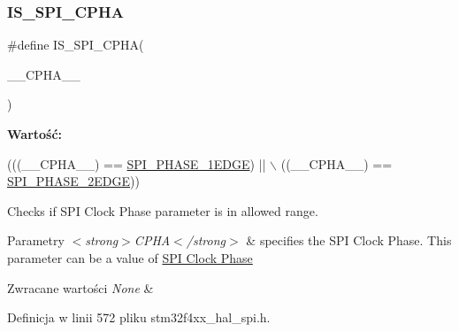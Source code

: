 \mbox{\label{group___s_p_i___private___macros_gaf5ed92fbe83dada8ebcce64c04ef0f72}} 
\subsubsection{\texorpdfstring{I\+S\+\_\+\+S\+P\+I\+\_\+\+C\+P\+HA}{IS\_SPI\_CPHA}}
{\footnotesize\ttfamily \#define I\+S\+\_\+\+S\+P\+I\+\_\+\+C\+P\+HA(\begin{DoxyParamCaption}\item[{}]{\+\_\+\+\_\+\+C\+P\+H\+A\+\_\+\+\_\+ }\end{DoxyParamCaption})}

{\bfseries Wartość\+:}
\begin{DoxyCode}
(((\_\_CPHA\_\_) == \hyperlink{group___s_p_i___clock___phase_ga208be78b79c51df200a495c4d2110b57}{SPI\_PHASE\_1EDGE}) || \(\backslash\)
                               ((\_\_CPHA\_\_) == \hyperlink{group___s_p_i___clock___phase_ga960275ac1d01d302c48e713399990c36}{SPI\_PHASE\_2EDGE}))
\end{DoxyCode}


Checks if S\+PI Clock Phase parameter is in allowed range. 


\begin{DoxyParams}{Parametry}
{\em $<$strong$>$\+C\+P\+H\+A$<$/strong$>$} & specifies the S\+PI Clock Phase. This parameter can be a value of \hyperlink{group___s_p_i___clock___phase}{S\+PI Clock Phase} \\
\hline
\end{DoxyParams}

\begin{DoxyRetVals}{Zwracane wartości}
{\em None} & \\
\hline
\end{DoxyRetVals}


Definicja w linii 572 pliku stm32f4xx\+\_\+hal\+\_\+spi.\+h.

\mbox{\label{group___s_p_i___private___macros_gad60cb1a9c1e1f89e8e9740a0ca734443}} 
